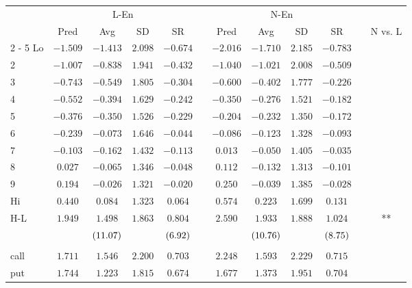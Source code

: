\begin{tabular}{@{}lccccccccccc@{}}%
\toprule%
&\multicolumn{4}{c}{L{-}En}&&\multicolumn{4}{c}{N{-}En}&&\\%
\multicolumn{1}{c}{}&\multicolumn{1}{c}{Pred}&\multicolumn{1}{c}{Avg}&\multicolumn{1}{c}{SD}&\multicolumn{1}{c}{SR}&\multicolumn{1}{c}{}&\multicolumn{1}{c}{Pred}&\multicolumn{1}{c}{Avg}&\multicolumn{1}{c}{SD}&\multicolumn{1}{c}{SR}&\multicolumn{1}{c}{}&\multicolumn{1}{c}{N vs. L}\\%
\cmidrule{2%
-%
5}%
\cmidrule{7%
-%
10}%
\cmidrule{12%
-%
12}%
Lo&$-1.509$&$-1.413$&$2.098$&$-0.674$&&$-2.016$&$-1.710$&$2.185$&$-0.783$&&\\%
2&$-1.007$&$-0.838$&$1.941$&$-0.432$&&$-1.040$&$-1.021$&$2.008$&$-0.509$&&\\%
3&$-0.743$&$-0.549$&$1.805$&$-0.304$&&$-0.600$&$-0.402$&$1.777$&$-0.226$&&\\%
4&$-0.552$&$-0.394$&$1.629$&$-0.242$&&$-0.350$&$-0.276$&$1.521$&$-0.182$&&\\%
5&$-0.376$&$-0.350$&$1.526$&$-0.229$&&$-0.204$&$-0.232$&$1.350$&$-0.172$&&\\%
6&$-0.239$&$-0.073$&$1.646$&$-0.044$&&$-0.086$&$-0.123$&$1.328$&$-0.093$&&\\%
7&$-0.103$&$-0.162$&$1.432$&$-0.113$&&$0.013$&$-0.050$&$1.405$&$-0.035$&&\\%
8&$0.027$&$-0.065$&$1.346$&$-0.048$&&$0.112$&$-0.132$&$1.313$&$-0.101$&&\\%
9&$0.194$&$-0.026$&$1.321$&$-0.020$&&$0.250$&$-0.039$&$1.385$&$-0.028$&&\\%
Hi&$0.440$&$0.084$&$1.323$&$0.064$&&$0.574$&$0.223$&$1.699$&$0.131$&&\\%
\midrule%
H{-}L&$1.949$&$1.498$&$1.863$&$0.804$&&$2.590$&$1.933$&$1.888$&$1.024$&&**\\%
&&$\footnotesize{(11.07)}$&&$\footnotesize{(6.92)}$&&&$\footnotesize{(10.76)}$&&$\footnotesize{(8.75)}$&&\\%
&&&&&&&&&&&\\%
call&$1.711$&$1.546$&$2.200$&$0.703$&&$2.248$&$1.593$&$2.229$&$0.715$&&\\%
put&$1.744$&$1.223$&$1.815$&$0.674$&&$1.677$&$1.373$&$1.951$&$0.704$&&\\\bottomrule%
%
\end{tabular}